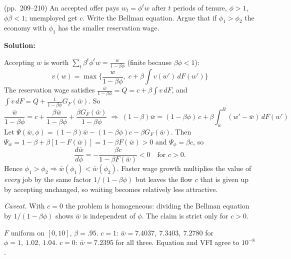 \documentclass[12pt, letterpaper]{article}
\newcommand{\wb}{\bar w}
\begin{document}
\begin{tcolorbox}[evenbox,title={Exercise 6.8 \quad Wage Growth Rate and the Reservation Wage}]
\begin{tcolorbox}[questionbox]
(pp.~209--210) An accepted offer pays $w_t=\phi^tw$ after $t$ periods of tenure, $\phi>1$, $\phi\beta<1$;
unemployed get $c$. Write the Bellman equation. Argue that if $\phi_1>\phi_2$ the economy with $\phi_1$ has
the smaller reservation wage.
\end{tcolorbox}

\textbf{Solution:}

Accepting $w$ is worth $\sum_t\beta^t\phi^tw=\frac{w}{1-\beta\phi}$ (finite because $\beta\phi<1$):
\[
\boxed{v(w)=\max\Big\{\frac{w}{1-\beta\phi},\;c+\beta\int v(w')\,dF(w')\Big\}}
\]
The reservation wage satisfies $\frac{\wb}{1-\beta\phi}=Q=c+\beta\int v\,dF$, and
$\int v\,dF=Q+\frac{1}{1-\beta\phi}G_F(\wb)$. So
\[
\frac{\wb}{1-\beta\phi}=c+\frac{\beta\wb}{1-\beta\phi}+\frac{\beta G_F(\wb)}{1-\beta\phi}
\;\Longrightarrow\;
\boxed{(1-\beta)\wb=(1-\beta\phi)\,c+\beta\int_{\wb}^B(w'-\wb)\,dF(w')}
\]
Let $\Psi(\wb,\phi)=(1-\beta)\wb-(1-\beta\phi)c-\beta G_F(\wb)$. Then
$\Psi_{\wb}=1-\beta+\beta[1-F(\wb)]=1-\beta F(\wb)>0$ and $\Psi_\phi=\beta c$, so
\[
\frac{d\wb}{d\phi}=-\frac{\beta c}{1-\beta F(\wb)}<0\quad\text{for }c>0 .
\]
Hence $\phi_1>\phi_2\Rightarrow\wb(\phi_1)<\wb(\phi_2)$. Faster wage growth multiplies the value of
\emph{every} job by the same factor $1/(1-\beta\phi)$ but leaves the flow $c$ that is given up by
accepting unchanged, so waiting becomes relatively less attractive.

\emph{Caveat.} With $c=0$ the problem is homogeneous: dividing the Bellman equation by $1/(1-\beta\phi)$
shows $\wb$ is independent of $\phi$. The claim is strict only for $c>0$.

\begin{tcolorbox}[databox]
$F$ uniform on $[0,10]$, $\beta=.95$. $c=1$: $\wb=7.4037,\ 7.3403,\ 7.2780$ for $\phi=1,\ 1.02,\ 1.04$.
$c=0$: $\wb=7.2395$ for all three. Equation and VFI agree to $10^{-8}$.
\end{tcolorbox}
\end{tcolorbox}
\end{document}
